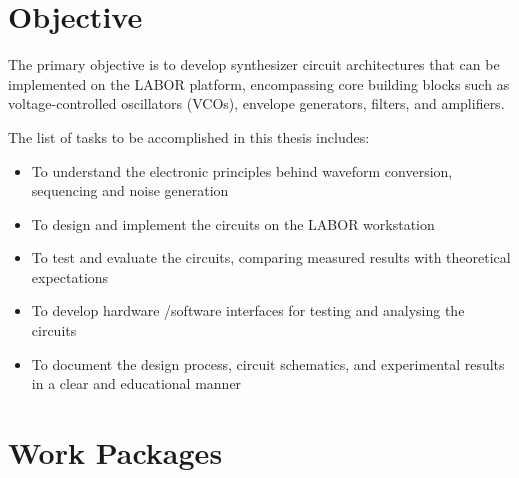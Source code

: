 \documentclass[
  11pt,
  a4paper,
  twoside]{scrbook}
\begin{document}
\section{Objective}\label{objective}

The primary objective is to develop synthesizer circuit architectures
that can be implemented on the LABOR platform, encompassing core
building blocks such as voltage-controlled oscillators (VCOs), envelope
generators, filters, and amplifiers.

The list of tasks to be accomplished in this thesis includes:

\begin{itemize}
\item
  To understand the electronic principles behind waveform conversion,
  sequencing and noise generation
\item
  To design and implement the circuits on the LABOR workstation
\item
  To test and evaluate the circuits, comparing measured results with
  theoretical expectations
\item
  To develop hardware /software interfaces for testing and analysing the
  circuits
\item
  To document the design process, circuit schematics, and experimental
  results in a clear and educational manner
\end{itemize}

\section{Work Packages}\label{work-packages}
\end{document}
